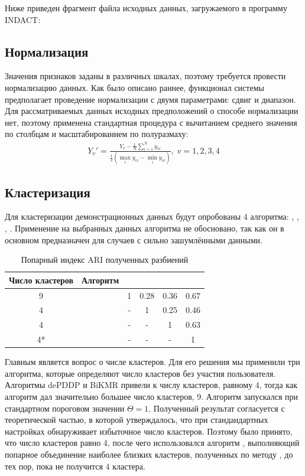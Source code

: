 \documentclass[12pt]{diploma}
\begin{document}
	Ниже приведен фрагмент файла исходных данных, загружаемого в программу INDACT:
	
	
	\subsection{Нормализация}
	Значения признаков заданы в различных шкалах, поэтому требуется провести нормализацию данных. Как было описано раннее, функционал системы предполагает проведение нормализации с двумя параметрами: сдвиг и диапазон. Для рассматриваемых данных исходных предположений о способе нормализации нет, поэтому применена стандартная процедура с вычитанием среднего значения по столбцам и масштабированием по полуразмаху:
	\begin{gather*}
	Y_v'=\frac{Y_v-\frac{1}{N}\sum_{i=1}^{N}y_{iv}}{\frac{1}{2}(\max_{i} y_{iv}- \min_{i}y_{iv})},\;v=1,2,3,4
	\end{gather*}	
	\subsection{Кластеризация}
	Для кластеризации демонстрационных данных будут опробованы 4 алгоритма: \ikmeans, \dePDDP, \BiKMR, \AWard. Применение на выбранных данных алгоритма \AWardpb не обосновано, так как он в основном предназначен для случаев с сильно зашумлёнными данными.
	
	
	\renewcommand{\arraystretch}{1.5}

	\begin{table}[]
		\centering
		\caption{Попарный индекс ARI полученных разбиений}
		\label{tab:alg-ari}	
		\begin{tabular}{|c|c|c|c|c|c|}
			\hline
			 Число кластеров & Алгоритм & \ikmeans & \dePDDP & \BiKMR & \AWard \\ 
			\hline
			9 & \ikmeans  & 1 & 0.28 & 0.36  & 0.67  \\ 
			\hline
			4  & \dePDDP  & - & 1 & 0.25 & 0.46 \\ 
			\hline
			4   & \BiKMR  & - & - & 1 & 0.63 \\ 
			\hline
			4*   & \AWard & - & - & - & 1\\
			\hline
		\end{tabular} 
	\end{table}
	
       Главным является вопрос о числе кластеров. Для его решения мы применили три алгоритма, которые определяют число кластеров без участия пользователя. Алгоритмы dePDDP и BiKMR привели к числу кластеров, равному 4, тогда как алгоритм \ikmeans дал значительно большее число кластеров, 9. Алгоритм \ikmeans запускался при стандартном пороговом значении $ \Theta=1 $. Полученный результат согласуется с теоретической частью, в которой утверждалось, что \ikmeans при стандандартных настройках обнаруживает избыточное число кластеров. 
       Поэтому было принято, что число кластеров равно 4, после чего использовался алгоритм \AWard, выполняющий попарное объединение наиболее близких кластеров, полученных по методу \ikmeans, до тех пор, пока не получится 4 кластера. 
\end{document}
